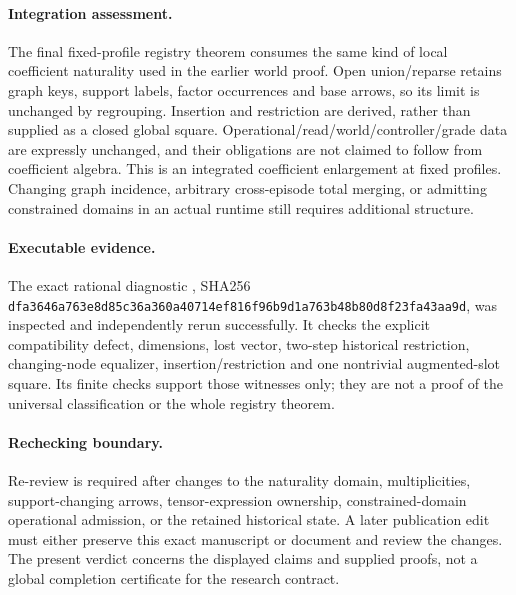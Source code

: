 \documentclass{article}
\begin{document}
\paragraph{Integration assessment.}
The final fixed-profile registry theorem consumes the same kind of local coefficient naturality used in the earlier world proof. Open union/reparse retains graph keys, support labels, factor occurrences and base arrows, so its limit is unchanged by regrouping. Insertion and restriction are derived, rather than supplied as a closed global square. Operational/read/world/controller/grade data are expressly unchanged, and their obligations are not claimed to follow from coefficient algebra. This is an integrated coefficient enlargement at fixed profiles. Changing graph incidence, arbitrary cross-episode total merging, or admitting constrained domains in an actual runtime still requires additional structure.

\paragraph{Executable evidence.}
The exact rational diagnostic , SHA256
\texttt{dfa3646a763e8d85c36a360a40714ef816f96b9d1a763b48b80d8f23fa43aa9d}, was inspected and independently rerun successfully. It checks the explicit compatibility defect, dimensions, lost vector, two-step historical restriction, changing-node equalizer, insertion/restriction and one nontrivial augmented-slot square. Its finite checks support those witnesses only; they are not a proof of the universal classification or the whole registry theorem.

\paragraph{Rechecking boundary.}
Re-review is required after changes to the naturality domain, multiplicities, support-changing arrows, tensor-expression ownership, constrained-domain operational admission, or the retained historical state. A later publication edit must either preserve this exact manuscript or document and review the changes. The present verdict concerns the displayed claims and supplied proofs, not a global completion certificate for the research contract.
\end{document}
